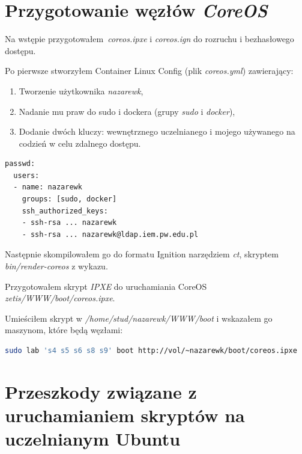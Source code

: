 \documentclass[a4paper,12pt,twoside,openany]{report}
\providecommand{\tightlist}{%
  \setlength{\itemsep}{0pt}\setlength{\parskip}{0pt}}
\begin{document}
\hypertarget{przygotowanie-wux119zux142uxf3w-coreos}{%
\section{\texorpdfstring{Przygotowanie węzłów
\emph{CoreOS}}{Przygotowanie węzłów CoreOS}}\label{przygotowanie-wux119zux142uxf3w-coreos}}

Na wstępie przygotowałem~\emph{coreos.ipxe} i \emph{coreos.ign} do
rozruchu i bezhasłowego dostępu.

Po pierwsze stworzyłem Container Linux Config (plik \emph{coreos.yml})
zawierający:

\begin{enumerate}
\def\labelenumi{\arabic{enumi}.}
\tightlist
\item
  Tworzenie użytkownika \emph{nazarewk},
\item
  Nadanie mu praw do sudo i dockera (grupy \emph{sudo} i \emph{docker}),
\item
  Dodanie dwóch kluczy: wewnętrznego uczelnianego i mojego używanego na
  codzień w celu zdalnego dostępu.
\end{enumerate}

\begin{lstlisting}
passwd:
  users:
  - name: nazarewk
    groups: [sudo, docker]
    ssh_authorized_keys:
    - ssh-rsa ... nazarewk
    - ssh-rsa ... nazarewk@ldap.iem.pw.edu.pl
\end{lstlisting}

Następnie skompilowałem go do formatu Ignition narzędziem \emph{ct},
skryptem \emph{bin/render-coreos} z wykazu.

Przygotowałem skrypt \emph{IPXE} do uruchamiania CoreOS
\emph{zetis/WWW/boot/coreos.ipxe}.

Umieściłem skrypt w \emph{/home/stud/nazarewk/WWW/boot} i wskazałem go
maszynom, które będą węzłami:

\begin{lstlisting}[language=bash]
sudo lab 's4 s5 s6 s8 s9' boot http://vol/~nazarewk/boot/coreos.ipxe 
\end{lstlisting}

\hypertarget{przeszkody-zwiux105zane-z-uruchamianiem-skryptuxf3w-na-uczelnianym-ubuntu}{%
\section{Przeszkody związane z uruchamianiem skryptów na uczelnianym
Ubuntu}\label{przeszkody-zwiux105zane-z-uruchamianiem-skryptuxf3w-na-uczelnianym-ubuntu}}
\end{document}
